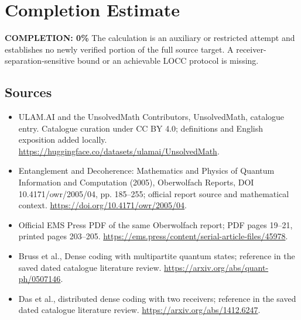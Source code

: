 \documentclass[11pt]{article}
\begin{document}
\section{Completion Estimate}
\noindent\textbf{COMPLETION: 0\%}
The calculation is an auxiliary or restricted attempt and establishes no newly verified portion of the full source target. A receiver-separation-sensitive bound or an achievable LOCC protocol is missing.

\subsection{Sources}
\begin{itemize}
\item[\hypertarget{source:statement:1}{S1}] ULAM.AI and the UnsolvedMath Contributors, UnsolvedMath, catalogue entry. Catalogue curation under CC BY 4.0; definitions and English exposition added locally.
\url{https://huggingface.co/datasets/ulamai/UnsolvedMath}.
\item[\hypertarget{source:statement:2}{S2}] Entanglement and Decoherence: Mathematics and Physics of Quantum Information and Computation (2005), Oberwolfach Reports, DOI 10.4171/owr/2005/04, pp. 185--255; official report source and mathematical context.
\url{https://doi.org/10.4171/owr/2005/04}.
\item[\hypertarget{source:statement:3}{S3}] Official EMS Press PDF of the same Oberwolfach report; PDF pages 19--21, printed pages 203--205.
\url{https://ems.press/content/serial-article-files/45978}.
\item[\hypertarget{source:statement:4}{S4}] Bruss et al., Dense coding with multipartite quantum states; reference in the saved dated catalogue literature review.
\url{https://arxiv.org/abs/quant-ph/0507146}.
\item[\hypertarget{source:statement:5}{S5}] Das et al., distributed dense coding with two receivers; reference in the saved dated catalogue literature review.
\url{https://arxiv.org/abs/1412.6247}.
\end{itemize}
\label{end:statement}
\end{document}
